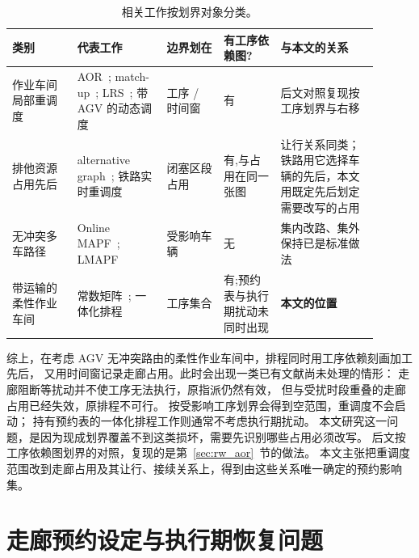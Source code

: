 \documentclass[manuscript,screen,review]{acmart}
\begin{document}
\begin{table}[t]
\centering
\caption{相关工作按划界对象分类。}
\label{tab:position}
\small
\begin{tabular}{@{}p{0.16\linewidth}p{0.22\linewidth}p{0.14\linewidth}p{0.14\linewidth}p{0.24\linewidth}@{}}
\toprule
\textbf{类别} & \textbf{代表工作} & \textbf{边界划在} & \textbf{有工序依赖图?} & \textbf{与本文的关系} \\
\midrule
作业车间局部重调度 &
AOR~\cite{abumaizar1997rescheduling,subramaniam2003maor};
match-up~\cite{akturk1999matchup};
LRS~\cite{kuster2007local};
带 AGV 的动态调度~\cite{zhang2023energy,tang2026dynamic} &
工序 / 时间窗 & 有 &
后文对照复现按工序划界与右移 \\
\addlinespace[2pt]
排他资源占用先后 &
alternative graph~\cite{mascis2002alternative};
铁路实时重调度~\cite{dariano2007branch} &
闭塞区段占用 & 有,与占用在同一张图 &
让行关系同类；铁路用它选择车辆的先后，本文用既定先后划定需要改写的占用 \\
\addlinespace[2pt]
无冲突多车路径 &
Online MAPF~\cite{svancara2019online,malka2024online};
LMAPF~\cite{zhang2024guidance} &
受影响车辆 & 无 &
集内改路、集外保持已是标准做法 \\
\addlinespace[2pt]
带运输的柔性作业车间 &
常数矩阵~\cite{xin2025review,meng2025cp,qin2026knowledge,fu2025integrated};
一体化排程~\cite{vanos2026exact,sun2023integrated,li2026framework} &
工序集合 & 有;预约表与执行期扰动未同时出现 &
\textbf{本文的位置} \\
\bottomrule
\end{tabular}
\end{table}

综上，在考虑 AGV 无冲突路由的柔性作业车间中，排程同时用工序依赖刻画加工先后，
又用时间窗记录走廊占用。此时会出现一类已有文献尚未处理的情形：
走廊阻断等扰动并不使工序无法执行，原指派仍然有效，
但与受扰时段重叠的走廊占用已经失效，原排程不可行。
按受影响工序划界会得到空范围，重调度不会启动；
持有预约表的一体化排程工作则通常不考虑执行期扰动。
本文研究这一问题，是因为现成划界覆盖不到这类损坏，需要先识别哪些占用必须改写。
后文按工序依赖图划界的对照，复现的是第~\ref{sec:rw_aor}~节的做法。
本文主张把重调度范围改到走廊占用及其让行、接续关系上，得到由这些关系唯一确定的预约影响集。

\section{走廊预约设定与执行期恢复问题}
\label{sec:problem}
\end{document}
